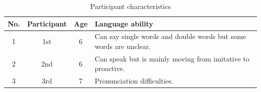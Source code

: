 \begin{table}
    \caption{Participant characteristics}
    \centering
    \small
    \begin{tabular}{|c|c|c|m{7cm}|}
    \hline
        {\textbf{No.}} & {\textbf{Participant}} & {\textbf{Age}} &{\textbf{Language ability}}\\
        \hline
        1 & 1st & 6 & Can say single words and double words but some words are unclear.\\ \hline
        2 & 2nd & 6 & Can speak but is mainly moving from imitative to proactive.\\ \hline
        3 & 3rd & 7 & Pronunciation difficulties.\\ \hline
    \end{tabular}
    \label{tb1}
\end{table}
\nopagebreak
